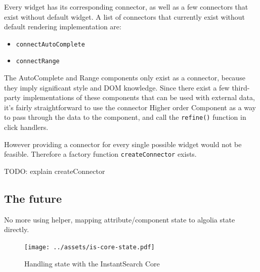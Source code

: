 Every widget has its corresponding connector, as well as a few connectors that exist without default widget. A list of connectors that currently exist without default rendering implementation are:

\begin{itemize}
  \item {\tt connectAutoComplete}
  \item {\tt connectRange}
\end{itemize}

The AutoComplete and Range components only exist as a connector, because they imply significant style and DOM knowledge. Since there exist a few third-party implementations of these components that can be used with external data, it's fairly straightforward to use the connector Higher order Component as a way to pass through the data to the component, and call the {\tt refine()} function in click handlers. 

However providing a connector for every single possible widget would not be feasible. Therefore a factory function {\tt createConnector} exists.

TODO: explain createConnector



\subsection{The future} %
\label{sub:the_future}

No more using helper, mapping attribute/component state to algolia state directly. %

\begin{figure}[H]
  \centering
  \texttt{[image: ../assets/is-core-state.pdf]}
  \caption{Handling state with the InstantSearch Core}
  \label{figure:is-core-state}
\end{figure}


